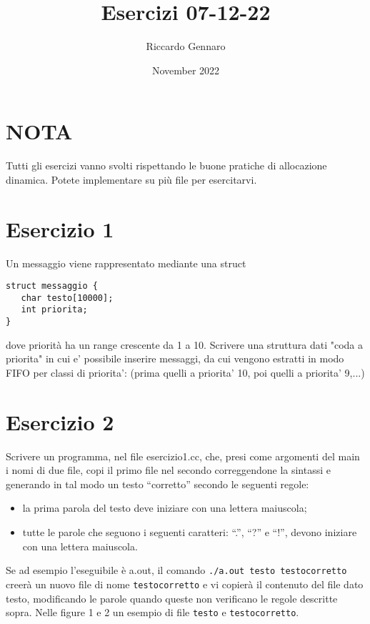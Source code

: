 \documentclass{article}
\title{Esercizi 07-12-22}
\author{Riccardo Gennaro}
\date{November 2022}
\begin{document}
\maketitle

\section*{NOTA}

Tutti gli esercizi vanno svolti rispettando le buone pratiche di allocazione dinamica. Potete implementare su più file per esercitarvi.

\section*{Esercizio 1}

Un messaggio viene rappresentato mediante una struct \\

\begin{verbatim}
struct messaggio {
   char testo[10000];
   int priorita;
}    
\end{verbatim}

dove priorità ha un range crescente da 1 a 10.
Scrivere una struttura dati "coda a priorita" in cui e' possibile inserire messaggi, da cui vengono estratti in modo FIFO per classi di priorita': (prima quelli a priorita' 10, poi quelli a priorita' 9,...)

\section*{Esercizio 2}

Scrivere un programma, nel file esercizio1.cc, che, presi come argomenti del main i nomi di due file, copi il primo file nel secondo correggendone la sintassi e generando in tal modo un testo “corretto” secondo le seguenti regole:

\begin{itemize}
   \item la prima parola del testo deve iniziare con una lettera maiuscola;
   \item tutte le parole che seguono i seguenti caratteri: “.”, “?” e “!”, devono iniziare con una lettera maiuscola.
\end{itemize}

Se ad esempio l'eseguibile è a.out, il comando \texttt{./a.out testo testocorretto} creerà un nuovo file di nome \texttt{testocorretto} e vi copierà il contenuto del file dato testo, modificando le parole quando queste non verificano le regole descritte sopra. Nelle figure 1 e 2 un esempio di file \texttt{testo} e \texttt{testocorretto}.
\end{document}
